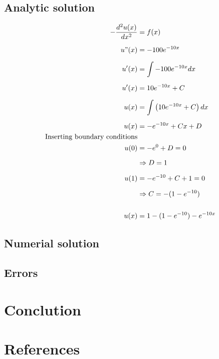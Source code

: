 \documentclass[norsk]{article}
\begin{document}
\subsection{Analytic solution}
\begin{align*}
-\frac{d^2u(x)}{dx^2} &= f(x) \\[6pt]
u"(x) &= -100e^{-10x} \\[6pt]
u'(x) &= \int -100e^{-10x} dx\\[6pt]
u'(x) &= 10e^{-10x} + C \\[6pt]
u(x) &= \int \left(10e^{-10x} + C\right) dx \\[6pt]
u(x) &= -e^{-10x} + Cx + D \\
\text{Inserting boundary conditions}\\
u(0) &= -e^0 + D = 0 \\[6pt]
&\Rightarrow D = 1 \\[6pt]
u(1) &= -e^{-10} + C + 1 = 0 \\[6pt]
&\Rightarrow C = -(1 - e^{-10})\\
\\
u(x) &= 1 - (1 - e^{-10}) - e^{-10x}\\
\end{align*}
\subsection{Numerial solution}
\subsection{Errors}
\section{Conclution}

\section{References}
\end{document}
